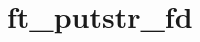 \chapter{ft\+\_\+putstr\+\_\+fd}
\hypertarget{md_Documentation_2ft__putstr__fd}{}\label{md_Documentation_2ft__putstr__fd}
